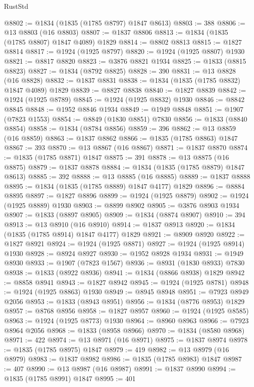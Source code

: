 \begin{lexlean}{RustStd}
\begin{coremodule}
{\begin{coremodule}
{{{{{@8802 := @1834 (@1835 (@1785 @8797) @1847 @8613)
@8803 := 388
@8806 := @13 @8803 (@16 @8803)
@8807 := @1837 @8806
@8813 := @1834 (@1835 (@1785 @8807) @1847 @4089) @1829
@8814 := @8802 @8813
@8815 := @1827 @8814
@8817 := @1924 (@1925 @8797)
@8820 := @1924 (@1925 @8807) @1930
@8821 := @8817 @8820
@8823 := @3876 @8821 @1934
@8825 := @1833 (@8815 @8823)
@8827 := @1834 (@8792 @8825)
@8828 := 390
@8831 := @13 @8828 (@16 @8828)
@8832 := @1837 @8831
@8838 := @1834 (@1835 (@1785 @8832) @1847 @4089) @1829
@8839 := @8827 @8838
@8840 := @1827 @8839
@8842 := @1924 (@1925 @8789)
@8845 := @1924 (@1925 @8832) @1930
@8846 := @8842 @8845
@8848 := @1952 @8846 @1934
@8849 := @1949 @8848
@8851 := @1907 (@7823 @1553)
@8854 := @8849 (@1830 @8851) @7830
@8856 := @1833 (@8840 @8854)
@8858 := @1834 (@8784 @8856)
@8859 := 396
@8862 := @13 @8859 (@16 @8859)
@8863 := @1837 @8862
@8866 := @1835 (@1785 @8863) @1847
@8867 := 393
@8870 := @13 @8867 (@16 @8867)
@8871 := @1837 @8870
@8874 := @1835 (@1785 @8871) @1847
@8875 := 391
@8878 := @13 @8875 (@16 @8875)
@8879 := @1837 @8878
@8884 := @1834 (@1835 (@1785 @8879) @1847 @8613)
@8885 := 392
@8888 := @13 @8885 (@16 @8885)
@8889 := @1837 @8888
@8895 := @1834 (@1835 (@1785 @8889) @1847 @4177) @1829
@8896 := @8884 @8895
@8897 := @1827 @8896
@8899 := @1924 (@1925 @8879)
@8902 := @1924 (@1925 @8889) @1930
@8903 := @8899 @8902
@8905 := @3876 @8903 @1934
@8907 := @1833 (@8897 @8905)
@8909 := @1834 (@8874 @8907)
@8910 := 394
@8913 := @13 @8910 (@16 @8910)
@8914 := @1837 @8913
@8920 := @1834 (@1835 (@1785 @8914) @1847 @4177) @1829
@8921 := @8909 @8920
@8922 := @1827 @8921
@8924 := @1924 (@1925 @8871)
@8927 := @1924 (@1925 @8914) @1930
@8928 := @8924 @8927
@8930 := @1952 @8928 @1934
@8931 := @1949 @8930
@8933 := @1907 (@7823 @1567)
@8936 := @8931 (@1830 @8933) @7830
@8938 := @1833 (@8922 @8936)
@8941 := @1834 (@8866 @8938) @1829
@8942 := @8858 @8941
@8943 := @1827 @8942
@8945 := @1924 (@1925 @8781)
@8948 := @1924 (@1925 @8863) @1930
@8949 := @8945 @8948
@8951 := @7923 @8949 @2056
@8953 := @1833 (@8943 @8951)
@8956 := @1834 (@8776 @8953) @1829
@8957 := @8768 @8956
@8958 := @1827 @8957
@8960 := @1924 (@1925 @8585)
@8963 := @1924 (@1925 @8773) @1930
@8964 := @8960 @8963
@8966 := @7923 @8964 @2056
@8968 := @1833 (@8958 @8966)
@8970 := @1834 (@8580 @8968)
@8971 := 422
@8974 := @13 @8971 (@16 @8971)
@8975 := @1837 @8974
@8978 := @1835 (@1785 @8975) @1847
@8979 := 419
@8982 := @13 @8979 (@16 @8979)
@8983 := @1837 @8982
@8986 := @1835 (@1785 @8983) @1847
@8987 := 407
@8990 := @13 @8987 (@16 @8987)
@8991 := @1837 @8990
@8994 := @1835 (@1785 @8991) @1847
@8995 := 401
}}}}}
\end{coremodule}}
\end{coremodule}
\end{lexlean}

